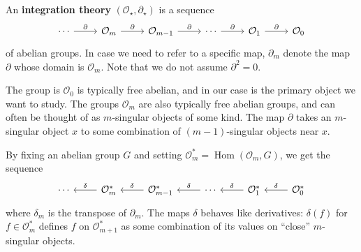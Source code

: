 \begin{definition}
	An \textbf{integration theory} \((\mathcal{O}_{\star}, \partial_{\star})\) is a sequence
	\[\begin{tikzcd}
		\cdots & {\mathcal{O}_{m}} & {\mathcal{O}_{m - 1}} & \cdots & {\mathcal{O}_{1}} & {\mathcal{O}_{0}}
		\arrow["\partial", from=1-1, to=1-2]
		\arrow["\partial", from=1-2, to=1-3]
		\arrow["\partial", from=1-3, to=1-4]
		\arrow["\partial", from=1-4, to=1-5]
		\arrow["\partial", from=1-5, to=1-6]
	\end{tikzcd}\]
	of abelian groups. In case we need to refer to a specific map, \(\partial_{m}\) denote the map \(\partial\) whose domain is \(\mathcal{O}_{m}\). Note that we do not assume \(\partial^{2} = 0\).
\end{definition}

The group is \(\mathcal{O}_{0}\) is typically free abelian, and in our case is the primary object we want to study. The groups \(\mathcal{O}_{m}\) are also typically free abelian groups, and can often be thought of as \(m\)-singular objects of some kind. The map \(\partial\) takes an \(m\)-singular object \(x\) to some combination of \((m - 1)\)-singular objects near \(x\).

By fixing an abelian group \(G\) and setting \(\mathcal{O}_{m}^{\ast} = \operatorname{Hom}(\mathcal{O}_{m}, G)\), we get the sequence
\[\begin{tikzcd}
	\cdots & {\mathcal{O}_{m}^{\ast}} & {\mathcal{O}_{m - 1}^{\ast}} & \cdots & {\mathcal{O}_{1}^{\ast}} & {\mathcal{O}_{0}^{\ast}}
	\arrow["\delta"', from=1-2, to=1-1]
	\arrow["\delta"', from=1-3, to=1-2]
	\arrow["\delta"', from=1-4, to=1-3]
	\arrow["\delta"', from=1-5, to=1-4]
	\arrow["\delta"', from=1-6, to=1-5]
\end{tikzcd}\]
where \(\delta_{m}\) is the transpose of \(\partial_{m}\). The maps \(\delta\) behaves like derivatives: \(\delta(f)\) for \(f \in \mathcal{O}_{m}^{\ast}\) defines \(f\) on \(\mathcal{O}_{m + 1}^{\ast}\) as some combination of its values on ``close'' \(m\)-singular objects.

